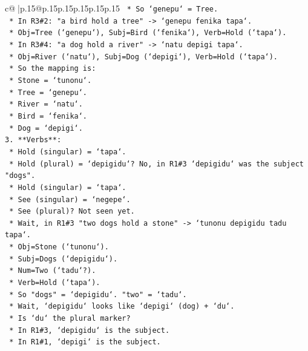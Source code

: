 \documentclass{article}
\begin{document}
{\begin{supertabular}{c@{$\;$}|p{.15\linewidth}@{}p{.15\linewidth}p{.15\linewidth}p{.15\linewidth}p{.15\linewidth}p{.15\linewidth}}
{{{\texttt{            *   So `genepu` = Tree.} \\
\texttt{        *   In R3\#2: "a bird hold a tree" {-}> `genepu fenika tapa`.} \\
\texttt{            *   Obj=Tree (`genepu`), Subj=Bird (`fenika`), Verb=Hold (`tapa`).} \\
\texttt{        *   In R3\#4: "a dog hold a river" {-}> `natu depigi tapa`.} \\
\texttt{            *   Obj=River (`natu`), Subj=Dog (`depigi`), Verb=Hold (`tapa`).} \\
\texttt{        *   So the mapping is:} \\
\texttt{            *   Stone = `tunonu`.} \\
\texttt{            *   Tree = `genepu`.} \\
\texttt{            *   River = `natu`.} \\
\texttt{            *   Bird = `fenika`.} \\
\texttt{            *   Dog = `depigi`.} \\
\texttt{3.  **Verbs**:} \\
\texttt{    *   Hold (singular) = `tapa`.} \\
\texttt{    *   Hold (plural) = `depigidu`? No, in R1\#3 `depigidu` was the subject "dogs".} \\
\texttt{    *   Hold (singular) = `tapa`.} \\
\texttt{    *   See (singular) = `negepe`.} \\
\texttt{    *   See (plural)? Not seen yet.} \\
\texttt{    *   Wait, in R1\#3 "two dogs hold a stone" {-}> `tunonu depigidu tadu tapa`.} \\
\texttt{        *   Obj=Stone (`tunonu`).} \\
\texttt{        *   Subj=Dogs (`depigidu`).} \\
\texttt{        *   Num=Two (`tadu`?).} \\
\texttt{        *   Verb=Hold (`tapa`).} \\
\texttt{        *   So "dogs" = `depigidu`. "two" = `tadu`.} \\
\texttt{        *   Wait, `depigidu` looks like `depigi` (dog) + `du`.} \\
\texttt{        *   Is `du` the plural marker?} \\
\texttt{        *   In R1\#3, `depigidu` is the subject.} \\
\texttt{        *   In R1\#1, `depigi` is the subject.} \\
}}}
\end{supertabular}}
\end{document}
